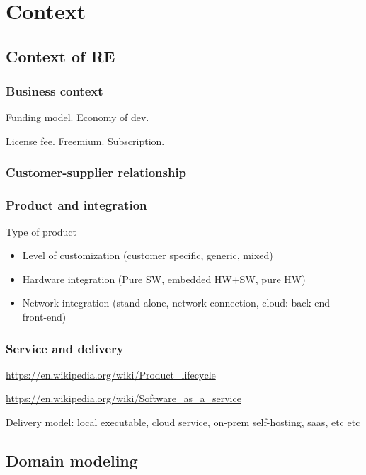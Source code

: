 
\chapter{Context}%

\section{Context of RE}

\subsection{Business context}
Funding model. Economy of dev.

License fee. Freemium. Subscription.

\subsection{Customer-supplier relationship}

\subsection{Product and integration}

Type of product

\begin{itemize}
  \item Level of customization (customer specific, generic, mixed)
  \item Hardware integration (Pure SW, embedded HW+SW, pure HW)
  \item Network integration (stand-alone, network connection, cloud: back-end -- front-end)
\end{itemize}

\subsection{Service and delivery}

\url{https://en.wikipedia.org/wiki/Product_lifecycle}

\url{https://en.wikipedia.org/wiki/Software_as_a_service}

Delivery model: local executable, cloud service, on-prem self-hosting, saas, etc etc


\section{Domain modeling}

